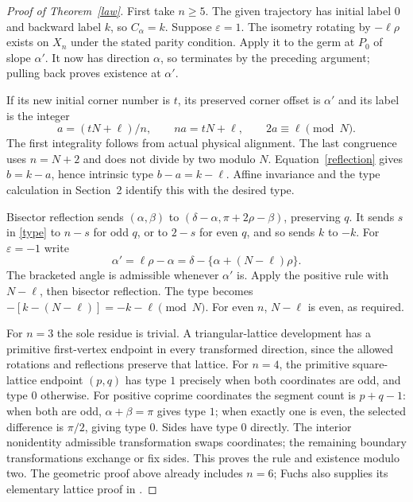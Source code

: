 \documentclass[11pt]{article}
\begin{document}
\begin{proof}[Proof of Theorem~\ref{law}]
First take $n\ge5$. The given trajectory has initial label $0$
and backward label $k$, so $C_\alpha=k$.
Suppose $\varepsilon=1$.
The isometry rotating by $-\ell\rho$ exists on $X_n$ under the stated
parity condition. Apply it to the germ at $P_0$ of slope $\alpha'$.
It now has direction $\alpha$, so terminates by the preceding argument;
pulling back proves existence at $\alpha'$.

If its new initial corner number is $t$, its preserved corner offset
is $\alpha'$ and its label is the integer
\[
a=(tN+\ell)/n,\qquad na=tN+\ell,\qquad 2a\equiv\ell\pmod N.
\]
The first integrality follows from actual physical alignment.
The last congruence uses $n=N+2$ and does not divide by two modulo $N$.
Equation~\eqref{reflection} gives $b=k-a$, hence intrinsic type
$b-a=k-\ell$. Affine invariance and the type calculation in
Section~2 identify this with the desired type.

Bisector reflection sends
$(\alpha,\beta)$ to $(\delta-\alpha,\pi+2\rho-\beta)$, preserving $q$.
It sends $s$ in \eqref{type} to $n-s$ for odd $q$, or to $2-s$
for even $q$, and so sends $k$ to $-k$.
For $\varepsilon=-1$ write
\[
\alpha'=\ell\rho-\alpha
=\delta-\{\alpha+(N-\ell)\rho\}.
\]
The bracketed angle is admissible whenever $\alpha'$ is.
Apply the positive rule with $N-\ell$, then bisector reflection.
The type becomes $-[k-(N-\ell)]=-k-\ell\pmod N$.
For even $n$, $N-\ell$ is even, as required.

For $n=3$ the sole residue is trivial. A triangular-lattice development
has a primitive first-vertex endpoint in every transformed direction,
since the allowed rotations and reflections preserve that lattice.
For $n=4$, the primitive square-lattice endpoint $(p,q)$ has type
$1$ precisely when both coordinates are odd, and type $0$ otherwise.
For positive coprime coordinates the segment count is $p+q-1$:
when both are odd, $\alpha+\beta=\pi$ gives type $1$;
when exactly one is even, the selected difference is $\pi/2$,
giving type $0$. Sides have type $0$ directly.
The interior nonidentity admissible transformation swaps coordinates;
the remaining boundary transformations exchange or fix sides.
This proves the rule and existence modulo two.
The geometric proof above already includes $n=6$; Fuchs also supplies
its elementary lattice proof in \cite[pp.~511--512]{Fuchs}.
\end{proof}
\end{document}
